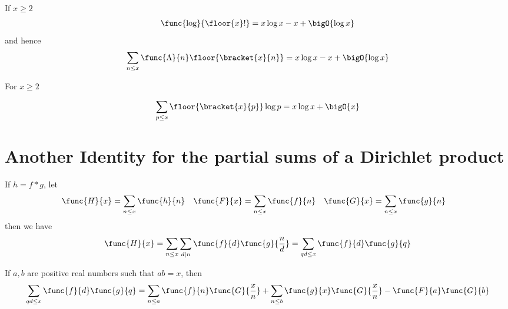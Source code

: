 \begin{theorem}
    If \(x \geq 2\) 
    \begin{align*}
        \func{\log}{\floor{x}!} = x \log x - x + \bigO{\log x}
    \end{align*}
    and hence 
    \begin{equation*}
        \sum_{n\leq x} \func{\Lambda}{n} \floor{\bracket{x}{n}} = x \log x - x + \bigO{\log x}
    \end{equation*}
\end{theorem}

\begin{theorem}
    For \(x \geq 2\)

    \begin{equation*}
        \sum_{p\leq x} \floor{\bracket{x}{p}} \log p = x \log x + \bigO{x}
    \end{equation*}
\end{theorem}
\section{Another Identity for the partial sums of a Dirichlet product}
\begin{theorem}
    If \(h = f \ast g\), let 
    \begin{align*}
        \func{H}{x} &= \sum_{n \leq x} \func{h}{n} & \func{F}{x} &= \sum_{n \leq x} \func{f}{n} & \func{G}{x} &= \sum_{n \leq x} \func{g}{n}
    \end{align*}
    then we have 
    \begin{equation*}
        \func{H}{x} = \sum_{n \leq x}\sum_{d \mid n} \func{f}{d} \func{g}{\frac{n}{d}} = \sum_{qd \leq x}\func{f}{d} \func{g}{q}
    \end{equation*}
\end{theorem}
\begin{theorem}
    If \(a,b\) are positive real numbers such that \(ab = x\), then 
    \begin{equation*}
        \sum_{qd \leq x}\func{f}{d} \func{g}{q} = \sum_{n \leq a}\func{f}{n} \func{G}{\dfrac{x}{n}} +  \sum_{n \leq b}\func{g}{x} \func{G}{\dfrac{x}{n}} - \func{F}{a}\func{G}{b} 
    \end{equation*}
\end{theorem}